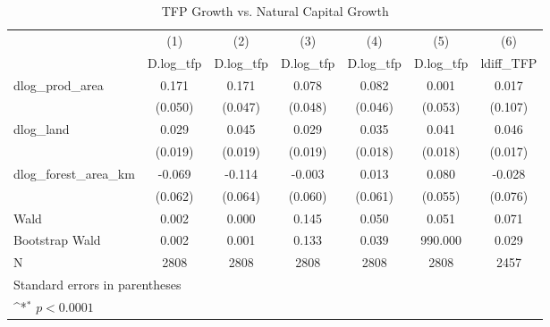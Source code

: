 \begin{table}[htbp]\centering
\def\sym#1{\ifmmode^{#1}\else\(^{#1}\)\fi}
\caption{TFP Growth vs. Natural Capital Growth}
\begin{tabular}{l*{6}{c}}
\hline\hline
            &\multicolumn{1}{c}{(1)}&\multicolumn{1}{c}{(2)}&\multicolumn{1}{c}{(3)}&\multicolumn{1}{c}{(4)}&\multicolumn{1}{c}{(5)}&\multicolumn{1}{c}{(6)}\\
            &\multicolumn{1}{c}{D.log\_tfp}&\multicolumn{1}{c}{D.log\_tfp}&\multicolumn{1}{c}{D.log\_tfp}&\multicolumn{1}{c}{D.log\_tfp}&\multicolumn{1}{c}{D.log\_tfp}&\multicolumn{1}{c}{ldiff\_TFP}\\
\hline
dlog\_prod\_area&       0.171       &       0.171       &       0.078       &       0.082       &       0.001       &       0.017       \\
            &     (0.050)       &     (0.047)       &     (0.048)       &     (0.046)       &     (0.053)       &     (0.107)       \\
[1em]
dlog\_land   &       0.029       &       0.045       &       0.029       &       0.035       &       0.041       &       0.046       \\
            &     (0.019)       &     (0.019)       &     (0.019)       &     (0.018)       &     (0.018)       &     (0.017)       \\
[1em]
dlog\_forest\_area\_km&      -0.069       &      -0.114       &      -0.003       &       0.013       &       0.080       &      -0.028       \\
            &     (0.062)       &     (0.064)       &     (0.060)       &     (0.061)       &     (0.055)       &     (0.076)       \\
\hline
Wald        &       0.002       &       0.000       &       0.145       &       0.050       &       0.051       &       0.071       \\
Bootstrap Wald&       0.002       &       0.001       &       0.133       &       0.039       &     990.000       &       0.029       \\
N           &        2808       &        2808       &        2808       &        2808       &        2808       &        2457       \\
\hline\hline
\multicolumn{7}{l}{\footnotesize Standard errors in parentheses}\\
\multicolumn{7}{l}{\footnotesize \sym{*} \(p<0.0001\)}\\
\end{tabular}
\end{table}
